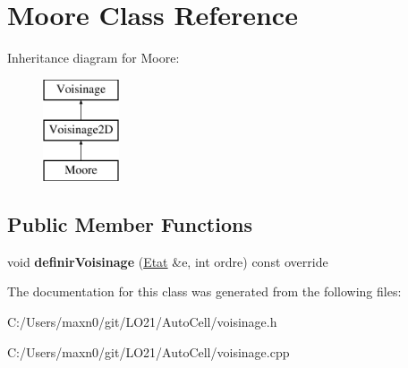 \hypertarget{class_moore}{}\section{Moore Class Reference}
\label{class_moore}
Inheritance diagram for Moore\+:\begin{figure}[H]
\begin{center}
\leavevmode
\includegraphics[height=3.000000cm]{class_moore}
\end{center}
\end{figure}
\subsection*{Public Member Functions}
\begin{DoxyCompactItemize}
\item 
\mbox{\label{class_moore_a10c9af6e08ed2d359135f3cdd1d03c93}} 
void {\bfseries definir\+Voisinage} (\mbox{\hyperlink{class_etat}{Etat}} \&e, int ordre) const override
\end{DoxyCompactItemize}


The documentation for this class was generated from the following files\+:\begin{DoxyCompactItemize}
\item 
C\+:/\+Users/maxn0/git/\+L\+O21/\+Auto\+Cell/voisinage.\+h\item 
C\+:/\+Users/maxn0/git/\+L\+O21/\+Auto\+Cell/voisinage.\+cpp\end{DoxyCompactItemize}
